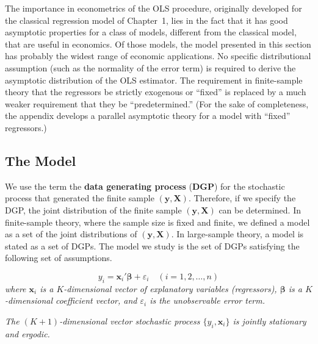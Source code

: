
The importance in econometrics of the OLS procedure, originally developed for the
classical regression model of Chapter~1, lies in the fact that it has good asymptotic
properties for a class of models, different from the classical model, that are useful
in economics.  Of those models, the model presented in this section has probably the
widest range of economic applications.  No specific distributional assumption (such
as the normality of the error term) is required to derive the asymptotic distribution
of the OLS estimator.  The requirement in finite-sample theory that the regressors be
strictly exogenous or ``fixed'' is replaced by a much weaker requirement that they be
``predetermined.''  (For the sake of completeness, the appendix develops a parallel
asymptotic theory for a model with ``fixed'' regressors.)

\subsection*{The Model}

We use the term the \textbf{data generating process} (\textbf{DGP}) for the stochastic
process that generated the finite sample $(\mathbf{y}, \mathbf{X})$.  Therefore, if we
specify the DGP, the joint distribution of the finite sample $(\mathbf{y}, \mathbf{X})$
can be determined.  In finite-sample theory, where the sample size is fixed and
finite, we defined a model as a set of the joint distributions of
$(\mathbf{y}, \mathbf{X})$.  In large-sample theory, a model is stated as a set of
DGPs.  The model we study is the set of DGPs satisfying the following set of
assumptions.

\begin{assumption}[linearity]
\label{ass:2.1}
\begin{equation*}
  y_i = \mathbf{x}_i'\bm{\beta} + \varepsilon_i
  \quad (i = 1, 2, \ldots, n)
\end{equation*}
\emph{where $\mathbf{x}_i$ is a $K$-dimensional vector of explanatory variables
(regressors), $\bm{\beta}$ is a $K$-dimensional coefficient vector, and
$\varepsilon_i$ is the unobservable error term.}
\end{assumption}

\begin{assumption}
\label{ass:2.2}
\emph{The $(K+1)$-dimensional vector stochastic process $\{y_i, \mathbf{x}_i\}$ is
jointly stationary and ergodic.}
\end{assumption}


